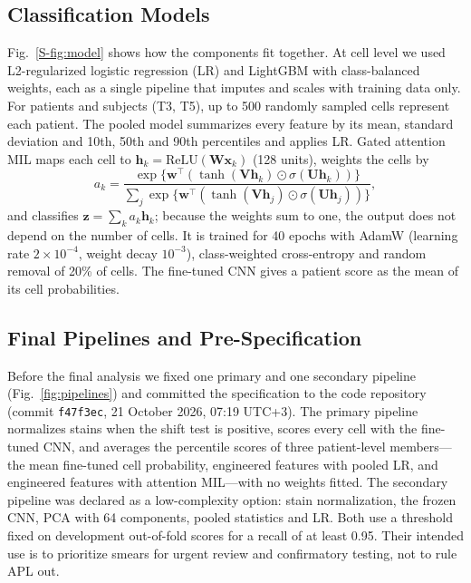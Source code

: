 \documentclass[journal]{IEEEtran}
\begin{document}
\subsection{Classification Models}
Fig.~\ref{S-fig:model} shows how the components fit together. At cell level we used L2-regularized logistic regression (LR) and LightGBM \cite{ke2017lightgbm} with class-balanced weights, each as a single pipeline that imputes and scales with training data only. For patients and subjects (T3, T5), up to 500 randomly sampled cells represent each patient. The pooled model summarizes every feature by its mean, standard deviation and 10th, 50th and 90th percentiles and applies LR. Gated attention MIL \cite{ilse2018abmil} maps each cell to $\mathbf{h}_k=\mathrm{ReLU}(\mathbf{W}\mathbf{x}_k)$ (128 units), weights the cells by
\begin{equation}
a_k=\frac{\exp\{\mathbf{w}^{\top}(\tanh(\mathbf{V}\mathbf{h}_k)\odot\sigma(\mathbf{U}\mathbf{h}_k))\}}{\sum_{j}\exp\{\mathbf{w}^{\top}(\tanh(\mathbf{V}\mathbf{h}_j)\odot\sigma(\mathbf{U}\mathbf{h}_j))\}},
\end{equation}
and classifies $\mathbf{z}=\sum_k a_k\mathbf{h}_k$; because the weights sum to one, the output does not depend on the number of cells. It is trained for 40 epochs with AdamW (learning rate $2\times10^{-4}$, weight decay $10^{-3}$), class-weighted cross-entropy and random removal of 20\% of cells. The fine-tuned CNN gives a patient score as the mean of its cell probabilities.

\subsection{Final Pipelines and Pre-Specification}
\label{sec:final}
Before the final analysis we fixed one primary and one secondary pipeline (Fig.~\ref{fig:pipelines}) and committed the specification to the code repository (commit \texttt{f47f3ec}, 21 October 2026, 07:19 UTC+3). The primary pipeline normalizes stains when the shift test is positive, scores every cell with the fine-tuned CNN, and averages the percentile scores of three patient-level members---the mean fine-tuned cell probability, engineered features with pooled LR, and engineered features with attention MIL---with no weights fitted. The secondary pipeline was declared as a low-complexity option: stain normalization, the frozen CNN, PCA with 64 components, pooled statistics and LR. Both use a threshold fixed on development out-of-fold scores for a recall of at least 0.95. Their intended use is to prioritize smears for urgent review and confirmatory testing, not to rule APL out.
\end{document}
